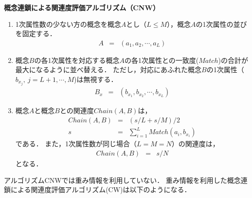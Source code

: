 {\bf 概念連鎖による関連度評価アルゴリズム（CNW）}
\begin{enumerate}
\item 1次属性数の少ない方の概念を概念$A$とし（$L \le M$），概念$A$の1次属性の並びを固定する．
	\begin{eqnarray}
	A &=& (a_1, a_2, \cdots, a_L)
	\end{eqnarray}
\item 概念$B$の各1次属性を対応する概念$A$の各1次属性との一致度($Match$)の合計が最大になるように並べ替える．
ただし，対応にあふれた概念$B$の1次属性（$b_{x_j}, \ j=L+1, \cdots, M$)は無視する．
	\begin{eqnarray}
	B_x &=& (b_{x_1}, b_{x_2}, \cdots, b_{x_L})
	\end{eqnarray}
\item 概念$A$と概念$B$との関連度$Chain(A,B)$は，
	\begin{eqnarray}
	Chain(A,B) &=& (s/L+s/M)/2  \label{Echain} \\
	s &=& \sum_{i=1}^L Match(a_i, b_{x_i}) \nonumber
	\end{eqnarray}
である．
また，1次属性数が同じ場合（$L=M=N$）の関連度は，
	\begin{eqnarray}
	Chain(A,B) &=& s/N
	\end{eqnarray}
となる．
\end{enumerate}

アルゴリズムCNWでは重み情報を利用していない．
重み情報を利用した概念連鎖による関連度評価アルゴリズム(CW)は以下のようになる．

